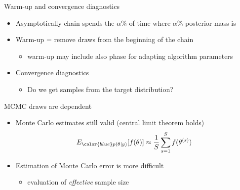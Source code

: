 \documentclass[finnish,english,t]{beamer}
\begin{document}
\begin{frame}{Warm-up and convergence diagnostics}

  \begin{itemize}
  \item Asymptotically chain spends the $\alpha$\% of time where
    $\alpha$\% posterior mass is
      \vspace{-.5\baselineskip}
    \item<3-> Warm-up = remove draws from the beginning of the chain
      \begin{itemize}
      \item warm-up may include also phase for adapting algorithm parameters
      \end{itemize}
    \item<4-> Convergence diagnostics 
      \begin{itemize}
      \item Do we get samples from the target distribution?
      \end{itemize}
  \end{itemize}

\end{frame}

\begin{frame}{MCMC draws are dependent}

  \begin{itemize}
    \item Monte Carlo estimates still valid (central limit theorem holds)
      \begin{align*}
        E_{\color{blue} p(\theta|y)}[f(\theta)] \approx \frac{1}{S} \sum_{s=1}^S f(\theta^{(s)})
      \end{align*}
    \item Estimation of Monte Carlo error is more difficult
      \begin{itemize}
      \item evaluation of {\it effective} sample size
      \end{itemize}
    \end{itemize}  

\end{frame}
\end{document}
